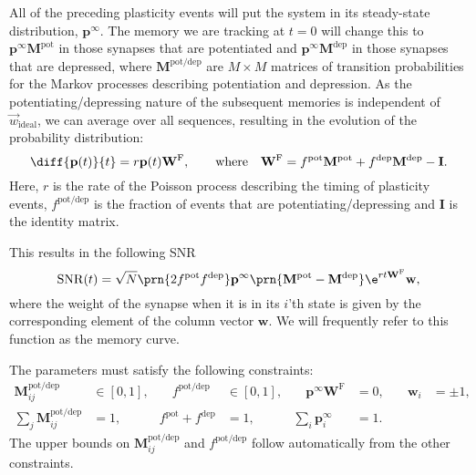 \documentclass{article} %
\DeclareMathOperator{\snr}{SNR}
\newcommand{\wvi}{\vec{w}_\text{ideal}}
\newcommand{\I}{\mathbf{I}}
\newcommand{\pr}{\mathbf{p}}
\newcommand{\eq}{\pr^\infty}
\newcommand{\w}{\mathbf{w}}
\newcommand{\W}{\mathbf{W}}
\newcommand{\M}{\mathbf{M}}
\newcommand{\frg}{\W^{\mathrm{F}}}
\newcommand{\pot}{^{\text{pot}}}
\newcommand{\dep}{^{\text{dep}}}
\newcommand{\potdep}{^{\text{pot/dep}}}
\begin{document}
All of the preceding plasticity events will put the system in its steady-state distribution, $\eq$.
The memory we are tracking at $t=0$ will change this to $\eq\M\pot$ in those synapses that are potentiated and $\eq\M\dep$ in those synapses that are depressed, where $\M\potdep$ are $M\times M$ matrices of transition probabilities for the Markov processes describing potentiation and depression.
As the potentiating/depressing nature of the subsequent memories is independent of $\wvi$, we can average over all sequences, resulting in the evolution of the probability distribution:
%
\begin{equation}\label{eq:evol}
  \diff{\pr(t)}{t} = r\pr(t)\frg,
  \qquad \text{where} \quad
  \frg = f\pot\M\pot + f\dep\M\dep - \I.
\end{equation}
%
Here, $r$ is the rate of the Poisson process describing the timing of plasticity events,
$f\potdep$ is the fraction of events that are potentiating/depressing and $\I$ is the identity matrix.

This results in the following SNR
%
\begin{equation}\label{eq:SNRcalc}
  \snr(t) = \sqrt{N}\prn{2 f\pot f\dep} \eq \prn{\M\pot-\M\dep} \e^{rt\frg} \w,
\end{equation}
%
where the weight of the synapse when it is in its $i$'th state is given by the corresponding element of the column vector $\w$.
We will frequently refer to this function as the memory curve.

The parameters must satisfy the following constraints:
%
\begin{equation}\label{eq:constr}
\begin{aligned}
  \M\potdep_{ij} &\in [0,1], &\quad
  f\potdep &\in [0,1], &\quad
  \eq\frg &= 0, &\quad
  \w_i &= \pm 1, \\
  \sum_j \M\potdep_{ij} &= 1, &
  f\pot + f\dep &= 1, &
  \sum_i \eq_i &= 1.
\end{aligned}
\end{equation}
%
The upper bounds on $\M\potdep_{ij}$ and $f\potdep$ follow automatically from the other constraints.
\end{document}
